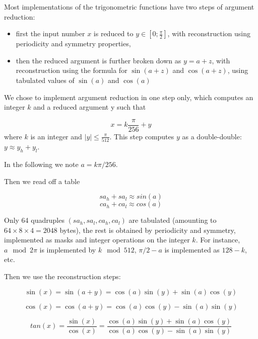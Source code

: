 Most implementations of the trigonometric functions have two steps of argument reduction: 
\begin{itemize}
\item first the input number $x$ is reduced to $y\in
  [0;\frac{\pi}{2}]$, with reconstruction using periodicity and
  symmetry properties,
\item then the reduced argument is further broken down as $y=a+z$,
  with reconstruction using the formula for $\sin(a+z)$ and
  $\cos(a+z)$, using tabulated values of $\sin(a)$ and
  $\cos(a)$
\end{itemize}

We chose to implement argument reduction in one step only, which
computes an integer $k$ and a reduced argument y such that

\begin{equation}
  x = k\frac{\pi}{256} + y\label{eq:trigoargred}
\end{equation}
where $k$ is an integer and  $ |y| \leq \frac{\pi}{512}$.
This step computes $y$ as a double-double: $y\approx y_h+y_l$. 

In the following we note $a=k\pi/256$. 

Then we read off a table 

$$sa_h+sa_l \approx sin(a)$$
$$ca_h+ca_l \approx cos(a)$$

Only 64 quadruples $(sa_h,sa_l,ca_h,ca_l)$ are tabulated (amounting to
$64\times 8 \times 4 = 2048$ bytes), the rest is obtained by
periodicity and symmetry, implemented as masks and integer operations
on the integer $k$. For instance,  $a \mod 2\pi$ is implemented by $k \mod 512$,
$\pi/2-a$ is implemented as $128-k$, etc.



Then we use the reconstruction steps:

\begin{equation}        
  \sin(x) = \sin(a + y) =  \cos(a) \sin(y) +  \sin(a) \cos(y) 
  \label{eq:sinapy}
\end{equation}

\begin{equation}
  \cos(x) = \cos(a + y) = \cos(a) \cos(y) -  \sin(a) \sin(y) 
  \label{eq:cosapy}
\end{equation}

\begin{equation} 
  tan(x) = \frac{\sin(x)}{\cos(x)} = \frac{\cos(a) \sin(y) +  \sin(a) \cos(y)}{\cos(a) \cos(y) -  \sin(a) \sin(y)}
  \label{eq:tanapy}
\end{equation}


